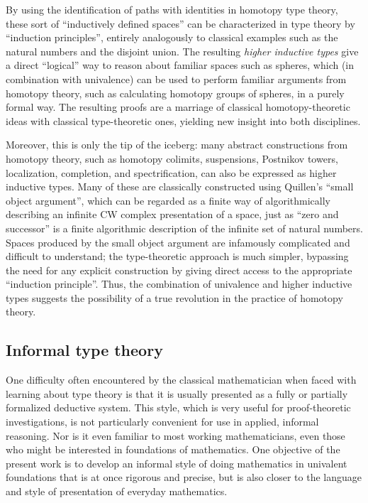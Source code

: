 By using the identification of paths with identities in homotopy type theory, these sort of ``inductively defined spaces'' can be characterized in type theory by ``induction principles'', entirely analogously to classical examples such as the natural numbers and the disjoint union.
The resulting \emph{higher inductive types} give a direct ``logical'' way to reason about familiar spaces such as spheres, which (in combination with univalence) can be used to perform familiar arguments from homotopy theory, such as calculating homotopy groups of spheres, in a purely formal way.
The resulting proofs are a marriage of classical homotopy-theoretic ideas with classical type-theoretic ones, yielding new insight into both disciplines.

Moreover, this is only the tip of the iceberg: many abstract constructions from homotopy theory, such as homotopy colimits, suspensions, Postnikov towers, localization, completion, and spectrification, can also be expressed as higher inductive types.
Many of these are classically constructed using Quillen's ``small object argument'', which can be regarded as a finite way of algorithmically describing an infinite CW complex presentation of a space, just as ``zero and successor'' is a finite algorithmic description of the infinite set of natural numbers.
Spaces produced by the small object argument are infamously complicated and difficult to understand; the type-theoretic approach is much simpler, bypassing the need for any explicit construction by giving direct access to the appropriate ``induction principle''.
Thus, the combination of univalence and higher inductive types suggests the possibility of a true revolution in the practice of homotopy theory.


\subsection*{Informal type theory}

One difficulty often encountered by the classical mathematician when faced with learning about type theory is that it is usually presented as a fully or partially formalized deductive system.
This style, which is very useful for proof-theoretic investigations, is not particularly convenient for use in applied, informal reasoning.
Nor is it even familiar to most working mathematicians, even those who might be interested in foundations of mathematics.
One objective of the present work is to develop an informal style of doing mathematics in univalent foundations that is at once rigorous and precise, but is also closer to the language and style of presentation of everyday mathematics.

